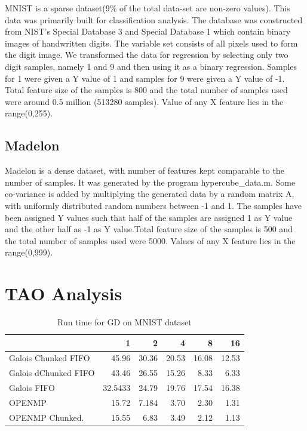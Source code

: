\documentclass{sigplanconf}
\begin{document}
MNIST is a sparse dataset(9\% of the total data-set are non-zero values). This data was primarily built for classification analysis. The database was constructed from NIST's Special Database 3 and Special Database 1 which contain binary images of handwritten digits. The variable set consists of all pixels used to form the digit image. We transformed the data for regression by selecting only two digit samples, namely 1 and 9 and then using it as a binary regression. Samples for 1 were given a Y value of 1 and samples for 9 were given a Y value of -1. Total feature size of the samples is 800 and the total number of samples used were around 0.5 million (513280 samples). Value of any X feature lies in the range(0,255).

\subsection{Madelon}
Madelon is a dense dataset, with number of features kept comparable to the number of samples. It was generated by the program hypercube\_data.m. Some co-variance is added by multiplying the generated data by a random matrix A, with uniformly distributed random numbers between -1 and 1. The samples have been assigned Y values such that half of the samples are assigned 1 as Y value and the other half as -1 as Y value.Total feature size of the samples is 500 and the total number of samples used were 5000. Values of any X feature lies in the range(0,999).

\section{TAO Analysis}

\begin{table}[htbp]
\caption{Run time for GD on MNIST dataset}
\begin{tabular}{|l|r|r|r|r|r|}
\hline
 & 1 & 2 & 4 & 8 & 16 \\ \hline
Galois Chunked FIFO & 45.96 & 30.36 & 20.53 & 16.08 & 12.53 \\ \hline
Galois dChunked FIFO & 43.46 & 26.55 & 15.26 & 8.33 & 6.33 \\ \hline
Galois FIFO & 32.5433 & 24.79 & 19.76 & 17.54 & 16.38 \\ \hline
OPENMP & 15.72 & 7.184 & 3.70 & 2.30 & 1.31 \\ \hline
OPENMP Chunked. & 15.55 & 6.83 & 3.49 & 2.12 & 1.13 \\ \hline
\end{tabular}
\end{table}
\end{document}
